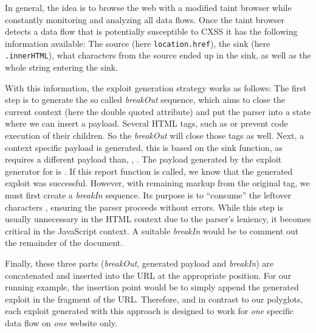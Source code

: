 In general, the idea is to browse the web with a modified taint browser while constantly monitoring and analyzing all data flows.
Once the taint browser detects a data flow that is potentially susceptible to CXSS it has the following information available:
The source (here \texttt{location.href}), the sink (here \texttt{.innerHTML}), what characters from the source ended up in the sink, as well as the whole string entering the sink.

With this information, the exploit generation strategy works as follows:
The first step is to generate the so called \emph{breakOut} sequence, which aims to close the current context (here the double quoted  attribute) and put the parser into a state where we can insert a \xss{} payload.
Several HTML tags, such as  or  prevent code execution of their children. So the \emph{breakOut} will close those tags as well.
Next, a context specific payload is generated, this is based on the sink function, as  requires a different payload than, \eg, . The payload generated by the exploit generator for  is .
If this report function is called, we know that the generated exploit was successful.
However, with remaining markup from the original  tag, we must first create  a \emph{breakIn} sequence.
Its purpose is to ``consume'' the leftover characters , ensuring the parser proceeds without errors.
While this step is usually unnecessary in the HTML context due to the parser's leniency, it becomes critical in the JavaScript context.
A suitable \emph{breakIn} would be to comment out the remainder of the document.

Finally, these three parts (\emph{breakOut}, generated payload and \emph{breakIn}) are concatenated and inserted into the URL at the appropriate position.
For our running example, the insertion point would be to simply append the generated exploit in the fragment of the URL.\@
Therefore, and in contrast to our polyglots, each exploit generated with this approach is designed to work for \emph{one} specific data flow on \emph{one} website only.

